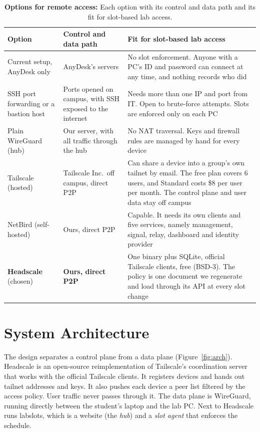 \documentclass[11pt,a4paper]{article}
\renewcommand{\arraystretch}{1.15}
\begin{document}
\begin{table}[H]
\centering\footnotesize
\renewcommand{\arraystretch}{1.05}
\caption{\textbf{Options for remote access:} Each option with its control and data path and its fit for slot-based lab access.}
\label{tab:why}
\begin{tabularx}{\textwidth}{P{3.0cm}P{3.3cm}Y}
\toprule
Option & Control and data path & Fit for slot-based lab access \\
\midrule
Current setup, AnyDesk only & AnyDesk's servers & No slot enforcement. Anyone with a PC's ID and password can connect at any time, and nothing records who did \\
SSH port forwarding or a bastion host & Ports opened on campus, with SSH exposed to the internet & Needs more than one IP and port from IT. Open to brute-force attempts. Slots are enforced only on each PC \\
Plain WireGuard (hub) & Our server, with all traffic through the hub & No NAT traversal. Keys and firewall rules are managed by hand for every device \\
Tailscale (hosted) & Tailscale Inc.\ off campus, direct P2P & Can share a device into a group's own tailnet by email. The free plan covers 6 users, and Standard costs \$8 per user per month. The control plane and user data stay off campus \\
NetBird (self-hosted) & Ours, direct P2P & Capable. It needs its own clients and five services, namely management, signal, relay, dashboard and identity provider \\
\textbf{Headscale} (chosen) & \textbf{Ours, direct P2P} & One binary plus SQLite, official Tailscale clients, free (BSD-3). The policy is one document we regenerate and load through its API at every slot change \\
\bottomrule
\end{tabularx}
\end{table}

\section{System Architecture}

The design separates a control plane from a data plane (Figure~\ref{fig:arch}).
Headscale is an open-source reimplementation of Tailscale's coordination server
that works with the official Tailscale clients. It registers devices and hands
out tailnet addresses and keys. It also pushes each device a peer list filtered
by the access policy. User traffic never passes through it. The data plane is
WireGuard, running directly between the student's laptop and the lab PC. Next
to Headscale runs labslots, which is a website (the \emph{hub}) and a \emph{slot
agent} that enforces the schedule.
\end{document}
